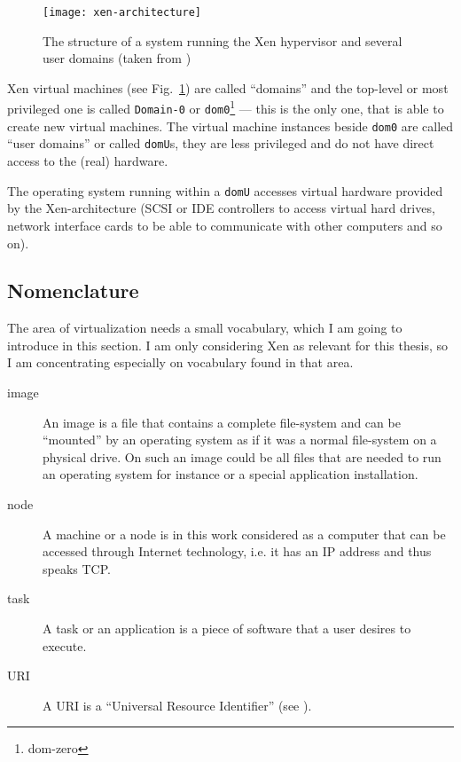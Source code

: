 \begin{figure}[htbp]
  \begin{center}
    \texttt{[image: xen-architecture]}
  \end{center}
  \caption[Xen architecture]{The structure of a system running the Xen
    hypervisor and several user domains (taken from \cite{xen-art})}
  \label{fig:xen-architecture}
\end{figure}

Xen  virtual  machines  (see Fig.~\ref{fig:xen-architecture})  are  called
``domains''  and   the  top-level  or   most  privileged  one   is  called
\texttt{Domain-0} or \texttt{dom0}\footnote{dom-zero} --- this is the only
one, that  is able  to create new  virtual machines.  The  virtual machine
instances  beside  \texttt{dom0} are  called  ``user  domains'' or  called
\texttt{domU}s, they are less privileged  and do not have direct access to
the (real) hardware.

The  operating  system running  within  a  \texttt{domU} accesses  virtual
hardware  provided by  the Xen-architecture  (SCSI or  IDE  controllers to
access  virtual  hard  drives,  network  interface cards  to  be  able  to
communicate with other computers and so on).

\subsection{Nomenclature}

The area of  virtualization needs a small vocabulary, which  I am going to
introduce in this section.  I am only considering Xen as relevant for this
thesis, so I am concentrating especially on vocabulary found in that area.
\begin{description}
\item[image] An image  is a file that contains  a complete file-system and
  can  be  ``mounted'' by  an  operating  system as  if  it  was a  normal
  file-system on  a physical drive.  On  such an image could  be all files
  that are  needed to run  an operating system  for instance or  a special
  application installation.
\item[node] A machine  or a node is in this work  considered as a computer
  that  can be accessed  through Internet  technology, i.e.  it has  an IP
  address and thus speaks TCP.
\item[task] A  task or an application is  a piece of software  that a user
  desires to execute.
\item[URI]   A   URI  is   a   ``Universal   Resource  Identifier''   (see
  \cite{rfc2396}).
\end{description}

